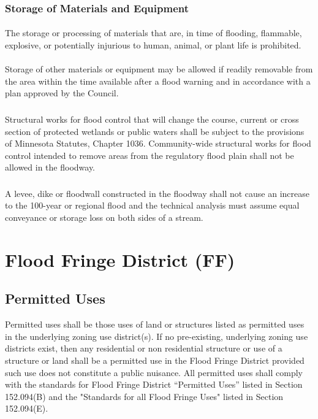 \subsubsection{Storage of Materials and Equipment}
\paragraph{}
The storage or processing of materials that are, in time of flooding, flammable, explosive, or potentially injurious to human, animal, or plant life is prohibited.
\paragraph{}
Storage of other materials or equipment may be allowed if readily removable from the area within the time available after a flood warning and in accordance with a plan approved by the Council.
\subsubsection{}
Structural works for flood control that will change the course, current or cross section of protected wetlands or public waters shall be subject to the provisions of Minnesota Statutes, Chapter 1036. Community-wide structural works for flood control intended to remove areas from the regulatory flood plain shall not be allowed in the floodway.
\subsubsection{}
A levee, dike or floodwall constructed in the floodway shall not cause an increase to the 100-year or regional flood and the technical analysis must assume equal conveyance or storage loss on both sides of a stream.
\section{Flood Fringe District (FF)}
\subsection{Permitted Uses}
Permitted uses shall be those uses of land or structures listed as permitted uses in the underlying zoning use district(s). If no pre-existing, underlying zoning use districts exist, then any residential or non residential structure or use of a structure or land shall be a permitted use in the Flood Fringe District provided such use does not constitute a public nuisance. All permitted uses shall comply with the standards for Flood Fringe District “Permitted Uses” listed in Section 152.094(B) and the "Standards for all Flood Fringe Uses" listed in Section 152.094(E).
